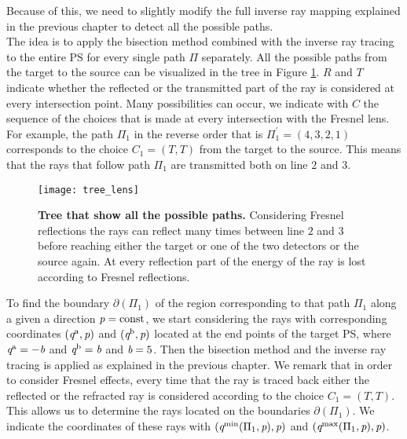 Because of this, we need to slightly modify the full inverse ray mapping explained in the previous chapter to detect all the possible paths. \\ \indent
The idea is to apply the bisection method combined with the inverse ray tracing to the entire PS for every single path $\Pi$ separately. All the possible paths from the target to the source can be visualized in the tree in Figure \ref{fig:tree_fresnel}. $R$ and $T$ indicate whether the reflected or the transmitted part of the ray is considered at every intersection point. Many possibilities can occur, we indicate with $C$ the sequence of the choices that is made at every intersection with the Fresnel lens. For example, the path $\Pi_1$ in the reverse order that is 
$\Pi_1^{\prime}=(4,3,2,1)$ corresponds to the choice $C_1= (T,T)$ from the target to the source. This means that the rays that follow path $\Pi_1$ are transmitted both on line $2$ and $3$. 
\begin{figure}[h]
  \begin{center}
  \texttt{[image: tree\_lens]}
  \end{center}
  \caption{\textbf{Tree that show all the possible paths.} Considering Fresnel reflections the rays can reflect many times between line $2$ and $3$ before reaching either the target or one of the two detectors or the source again. At every reflection part of the energy of the ray is lost according to Fresnel reflections.}
\label{fig:tree_fresnel}
 \end{figure}
To find the boundary $\partial$$(\Pi_1)$ of the region corresponding to that path $\Pi_1$ along a given a direction $\textit{p} = \textrm{const}$, we start considering the rays with corresponding coordinates $(\textit{q}^{\textrm{a}}, \textit{p})$ and $(\textit{q}^{\textrm{b}}, \textit{p})$ located at the end points of the target PS, where $\textit{q}^{\textrm{a}} = -\textit{b}$ and $\textit{q}^{\textrm{b}} = \textit{b}$ and $\textit{b}=5$. Then the bisection method and the inverse ray tracing is applied as explained in the previous chapter. We remark that in order to consider Fresnel effects, every time that the ray is traced back either the reflected or the refracted ray is considered according to the choice $C_1= (T,T)$. This allows us to determine the rays located on the boundaries $\partial$$(\Pi_1)$. We indicate the coordinates of these rays with $(\textit{q}^{\textrm{min}}(\Pi_1, \textit{p}), \textit{p})$ and $(\textit{q}^{\textrm{max}}(\Pi_1, \textit{p}), \textit{p})$. \\ \indent
